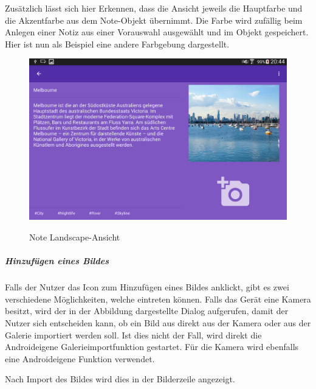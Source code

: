 Zusätzlich lässt sich hier Erkennen, dass die Ansicht jeweils die Hauptfarbe und die Akzentfarbe aus dem Note-Objekt übernimmt. Die Farbe wird zufällig beim Anlegen einer Notiz aus einer Vorauswahl ausgewählt und im Objekt gespeichert. Hier ist nun als Beispiel eine andere Farbgebung dargestellt.

\begin{figure}[H]
\centering
\begin{minipage}[t]{1\textwidth} %
\caption{Note Landscape-Ansicht} %
\includegraphics[width=1 \textwidth]{img/note_landscape.png}\\ %
\end{minipage}
\end{figure}

\subparagraph{Hinzufügen eines Bildes}
Falls der Nutzer das Icon zum Hinzufügen eines Bildes anklickt, gibt es zwei verschiedene Möglichkeiten, welche eintreten können. Falls das Gerät eine Kamera besitzt, wird der in der Abbildung dargestellte Dialog aufgerufen, damit der Nutzer sich entscheiden kann, ob ein Bild aus direkt aus der Kamera oder aus der Galerie importiert werden soll. Ist dies nicht der Fall, wird direkt die Androideigene Galerieimportfunktion gestartet. Für die Kamera wird ebenfalls eine Androideigene Funktion verwendet.

Nach Import des Bildes wird dies in der Bilderzeile angezeigt.


